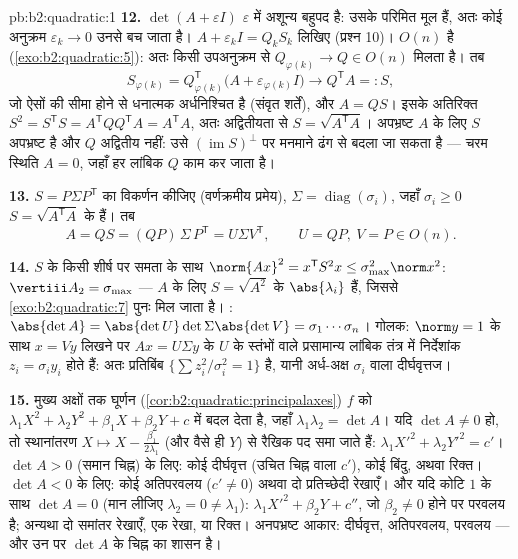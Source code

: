 \begin{solution}{pb:b2:quadratic:1}
\textbf{12.} $\det(A + \varepsilon I)$ $\varepsilon$ में अशून्य बहुपद है: उसके परिमित मूल हैं, अतः कोई
अनुक्रम $\varepsilon_k \to 0$ उनसे बच जाता है। $A + \varepsilon_kI =
Q_kS_k$ लिखिए (प्रश्न 10)। $O(n)$  है (\cref{exo:b2:quadratic:5}):
अतः किसी उपअनुक्रम से $Q_{\varphi(k)}
\to Q \in O(n)$ मिलता है। तब
\[
S_{\varphi(k)} = Q_{\varphi(k)}^{\mathsf T}
\bigl(A + \varepsilon_{\varphi(k)}I\bigr)
\longrightarrow Q^{\mathsf T}A =: S,
\]
जो ऐसों की सीमा होने से  धनात्मक अर्धनिश्चित है (संवृत शर्तें), और
$A = QS$। इसके अतिरिक्त $S^2 = S^{\mathsf T}S =
A^{\mathsf T}QQ^{\mathsf T}A = A^{\mathsf T}A$, अतः अद्वितीयता से $S =
\sqrt{A^{\mathsf T}A}$। अपभ्रष्ट $A$ के लिए $S$
अपभ्रष्ट है और $Q$ अद्वितीय नहीं: उसे $(\operatorname{im} S)^{\perp}$ पर मनमाने ढंग से बदला जा सकता
है --- चरम स्थिति $A = 0$, जहाँ हर लांबिक $Q$ काम कर जाता है।

\textbf{13.} $S = P\Sigma P^{\mathsf T}$ का विकर्णन कीजिए (वर्णक्रमीय प्रमेय), $\Sigma = \operatorname{diag}(\sigma_i)$, जहाँ $\sigma_i \geq 0$ $S =
\sqrt{A^{\mathsf T}A}$
के  हैं। तब
\[
A = QS = (QP)\,\Sigma\,P^{\mathsf T} = U\Sigma V^{\mathsf T},
\qquad U = QP,\ V = P \in O(n) .
\]

\textbf{14.} $S$ के किसी शीर्ष  पर समता के साथ $\norm{Ax}^2 = x^{\mathsf T}S^2x \leq
\sigma_{\max}^2\norm x^2$: $\vertiii A_2 = \sigma_{\max}$
---  $A$ के लिए $S = \sqrt{A^2}$ के  $\abs{\lambda_i}$ हैं, जिससे \cref{exo:b2:quadratic:7} पुनः मिल
जाता है। : $\abs{\det A} =
\abs{\det U}\det\Sigma\abs{\det V} = \sigma_1\cdots\sigma_n$। गोलक: $\norm y = 1$ के साथ $x = Vy$ लिखने पर $Ax = U\Sigma y$ के $U$ के
स्तंभों वाले प्रसामान्य लांबिक तंत्र में निर्देशांक $z_i = \sigma_iy_i$ होते हैं: अतः
प्रतिबिंब $\{\sum z_i^2/\sigma_i^2 =
1\}$ है, यानी अर्ध-अक्ष $\sigma_i$ वाला दीर्घवृत्तज।

\textbf{15.} मुख्य अक्षों तक घूर्णन (\cref{cor:b2:quadratic:principalaxes}) $f$ को $\lambda_1X^2 + \lambda_2Y^2 + \beta_1X + \beta_2Y + c$ में बदल देता है,
जहाँ $\lambda_1\lambda_2 = \det A$। यदि $\det A \neq 0$ हो, तो स्थानांतरण $X \mapsto X -
\frac{\beta_1}{2\lambda_1}$ (और वैसे ही $Y$) से रैखिक पद समा
जाते हैं: $\lambda_1X'^2
+ \lambda_2Y'^2 = c'$। $\det A > 0$ (समान चिह्न) के लिए: कोई दीर्घवृत्त (उचित चिह्न वाला
$c'$), कोई बिंदु, अथवा रिक्त। $\det
A < 0$ के लिए: कोई अतिपरवलय ($c' \neq 0$) अथवा दो
प्रतिच्छेदी रेखाएँ। और यदि कोटि $1$ के साथ $\det A = 0$ (मान लीजिए $\lambda_2 = 0 \neq
\lambda_1$): $\lambda_1X'^2 + \beta_2Y + c''$,
जो $\beta_2 \neq 0$ होने पर परवलय है; अन्यथा दो समांतर रेखाएँ, एक रेखा, या रिक्त।
अनपभ्रष्ट आकार: दीर्घवृत्त, अतिपरवलय, परवलय --- और उन पर $\det A$ के चिह्न का
शासन है।


\end{solution}
